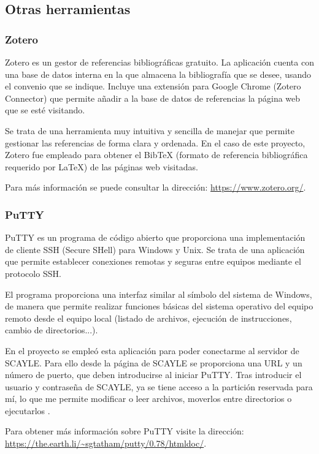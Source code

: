 \subsection{Otras herramientas}

\subsubsection{Zotero}

Zotero es un gestor de referencias bibliográficas gratuito. La aplicación cuenta con una base de datos interna en la que almacena la bibliografía que se desee, usando el convenio que se indique. Incluye una extensión para Google Chrome (Zotero Connector) que permite añadir a la base de datos de referencias la página web que se esté visitando. 

Se trata de una herramienta muy intuitiva y sencilla de manejar que permite gestionar las referencias de forma clara y ordenada. En el caso de este proyecto, Zotero fue empleado para obtener el BibTeX (formato de referencia bibliográfica requerido por LaTeX) de las páginas web visitadas. 

Para más información se puede consultar la dirección: \url{https://www.zotero.org/}.

\subsubsection{PuTTY}

PuTTY es un programa de código abierto que proporciona una implementación de cliente SSH (Secure SHell) para Windows y Unix. Se trata de una aplicación que permite establecer conexiones remotas y seguras entre equipos mediante el protocolo SSH.

El programa proporciona una interfaz similar al símbolo del sistema de Windows, de manera que permite realizar funciones básicas del sistema operativo del equipo remoto desde el equipo local (listado de archivos, ejecución de instrucciones, cambio de directorios...).

En el proyecto se empleó esta aplicación para poder conectarme al servidor de SCAYLE. Para ello desde la página de SCAYLE se proporciona una URL y un número de puerto, que deben introducirse al iniciar PuTTY. Tras introducir el usuario y contraseña de SCAYLE, ya se tiene acceso a la partición reservada para mí, lo que me permite modificar o leer archivos, moverlos entre directorios o ejecutarlos \cite{met:putty}.

Para obtener más información sobre PuTTY visite la dirección: \url{https://the.earth.li/~sgtatham/putty/0.78/htmldoc/}.

